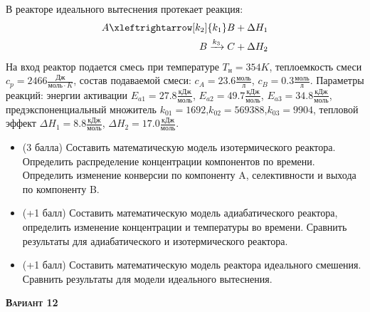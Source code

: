  В реакторе идеального вытеснения протекает реакция: \begin{equation*} \begin{aligned} A \xleftrightarrow[k_2]{k_1} B + \Delta H_1 \\ B \xrightarrow{k_3} C + \Delta H_2 \end{aligned} \end{equation*}                                      На вход  реактор подается смесь при температуре $ T_н =  354 K$, теплоемкость смеси $c_p= 2466 \frac{Дж}{моль \cdot K}$, состав подаваемой смеси: $c_A=23.6 \frac{моль}{л}$, $c_B=0.3 \frac{моль}{л}$. Параметры реакций: энергии активации $E_{a1}=27.8 \frac{кДж}{моль}$, $E_{a2}=49.7  \frac{кДж}{моль}$, $E_{a3}=34.8  \frac{кДж}{моль}$, предэкспоненциальный множитель $k_{01}=      1692$,$k_{02}=    569388$,$k_{03}=      9904$, тепловой эффект $\Delta H_1=  8.8  \frac{кДж}{моль}$, $\Delta H_2=17.0 \frac{кДж}{моль}$.\begin{itemize} \item (3 балла) Составить математическую модель изотермического реактора. Определить распределение концентрации компонентов по времени. Определить изменение конверсии по компоненту A, селективности и выхода по компоненту B. \item (+1 балл) Составить математическую модель адиабатического реактора, определить изменение концентрации и температуры во времени. Сравнить результаты для адиабатического и изотермического реактора. \item (+1 балл) Составить математическую модель реактора идеального смешения. Сравнить результаты для модели идеального вытеснения. \end{itemize}

\textsc{\textbf{Вариант 12}}

